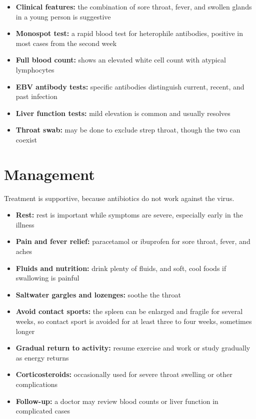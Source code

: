 \begin{itemize}
    \item \textbf{Clinical features:} the combination of sore throat, fever, and swollen glands in a young person is suggestive
    \item \textbf{Monospot test:} a rapid blood test for heterophile antibodies, positive in most cases from the second week
    \item \textbf{Full blood count:} shows an elevated white cell count with atypical lymphocytes
    \item \textbf{EBV antibody tests:} specific antibodies distinguish current, recent, and past infection
    \item \textbf{Liver function tests:} mild elevation is common and usually resolves
    \item \textbf{Throat swab:} may be done to exclude strep throat, though the two can coexist
\end{itemize}

\section*{Management}
Treatment is supportive, because antibiotics do not work against the virus.

\begin{itemize}
    \item \textbf{Rest:} rest is important while symptoms are severe, especially early in the illness
    \item \textbf{Pain and fever relief:} paracetamol or ibuprofen for sore throat, fever, and aches
    \item \textbf{Fluids and nutrition:} drink plenty of fluids, and soft, cool foods if swallowing is painful
    \item \textbf{Saltwater gargles and lozenges:} soothe the throat
    \item \textbf{Avoid contact sports:} the spleen can be enlarged and fragile for several weeks, so contact sport is avoided for at least three to four weeks, sometimes longer
    \item \textbf{Gradual return to activity:} resume exercise and work or study gradually as energy returns
    \item \textbf{Corticosteroids:} occasionally used for severe throat swelling or other complications
    \item \textbf{Follow-up:} a doctor may review blood counts or liver function in complicated cases
\end{itemize}

